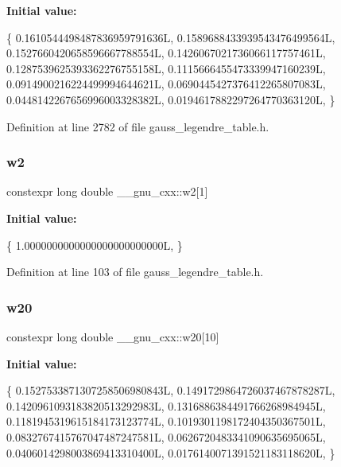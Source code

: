{\bfseries Initial value\+:}
\begin{DoxyCode}
\{
    0.1610544498487836959791636L,
    0.1589688433939543476499564L,
    0.1527660420658596667788554L,
    0.1426067021736066117757461L,
    0.1287539625393362276755158L,
    0.1115666455473339947160239L,
    0.0914900216224499994644621L,
    0.0690445427376412265807083L,
    0.0448142267656996003328382L,
    0.0194617882297264770363120L,
  \}
\end{DoxyCode}


Definition at line 2782 of file gauss\+\_\+legendre\+\_\+table.\+h.

\mbox{\label{namespace____gnu__cxx_ad1181895596ae9fdca61c42930828ed1}} 
\subsubsection{\texorpdfstring{w2}{w2}}
{\footnotesize\ttfamily constexpr long double \+\_\+\+\_\+gnu\+\_\+cxx\+::w2\mbox{[}1\mbox{]}}

{\bfseries Initial value\+:}
\begin{DoxyCode}
\{
    1.0000000000000000000000000L,
  \}
\end{DoxyCode}


Definition at line 103 of file gauss\+\_\+legendre\+\_\+table.\+h.

\mbox{\label{namespace____gnu__cxx_aa6d5b9a2b5539e57323b38b81d52795f}} 
\subsubsection{\texorpdfstring{w20}{w20}}
{\footnotesize\ttfamily constexpr long double \+\_\+\+\_\+gnu\+\_\+cxx\+::w20\mbox{[}10\mbox{]}}

{\bfseries Initial value\+:}
\begin{DoxyCode}
\{
    0.1527533871307258506980843L,
    0.1491729864726037467878287L,
    0.1420961093183820513292983L,
    0.1316886384491766268984945L,
    0.1181945319615184173123774L,
    0.1019301198172404350367501L,
    0.0832767415767047487247581L,
    0.0626720483341090635695065L,
    0.0406014298003869413310400L,
    0.0176140071391521183118620L,
  \}
\end{DoxyCode}


